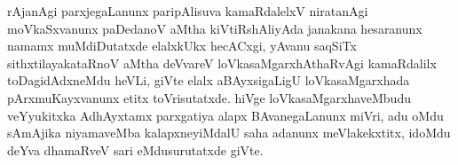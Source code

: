 rAjanAgi parxjegaLanunx paripAlisuva kamaRdalelxV niratanAgi moVkaSxvanunx paDedanoV aMtha kiVtiRshAliyAda janakana hesaranunx namamx muMdiDutatxde elalxkUkx hecACxgi, yAvanu saqSiTx sithxtilayakataRnoV aMtha deVvareV loVkasaMgarxhAthaRvAgi kamaRdalilx toDagidAdxneMdu heVLi, giVte elalx aBAyxsigaLigU loVkasaMgarxhada pArxmuKayxvanunx etitx toVrisutatxde. hiVge loVkasaMgarxhaveMbudu veYyukitxka AdhAyxtamx parxgatiya alapx BAvanegaLanunx miVri, adu oMdu sAmAjika niyamaveMba kalapxneyiMdalU saha adanunx meVlakekxtitx, idoMdu deYva dhamaRveV sari eMdusurutatxde giVte.

\newpage

\theendnotes
{}

